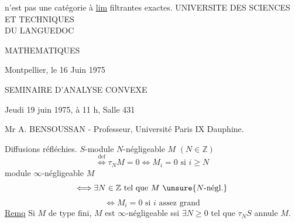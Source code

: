 n'est pas une catégorie à \uline{lim} filtrantes exactes.
UNIVERSITE DES SCIENCES ET TECHNIQUES\\
DU LANGUEDOC

MATHEMATIQUES

Montpellier, le 16 Juin 1975

SEMINAIRE D'ANALYSE CONVEXE

Jeudi 19 juin 1975, à 11 h, Salle 431

Mr A. BENSOUSSAN - Professeur, Université Paris IX Dauphine.

Diffusions réfléchies.
\(S\)-module \(N\)-négligeable \(M\) \((N\in\mathbb Z)\)
\[
\overset{\mathrm{def}}\Longleftrightarrow\tau_NM=0
 \Longleftrightarrow M_i=0\text{ si }i\geq N
\]
module \(\infty\)-négligeable \(M\)
\[
\Longleftrightarrow\exists N\in\mathbb Z\text{ tel que }M\ \unsure{N\text{-négl.}}
\]
\[\Longleftrightarrow M_i=0\text{ si }i\text{ assez grand}\]
\uline{Remq} Si \(M\) de type fini, \(M\) est \(\infty\)-négligeable ssi
\(\exists N\geq0\) tel que \(\tau_NS\) annule \(M\).

